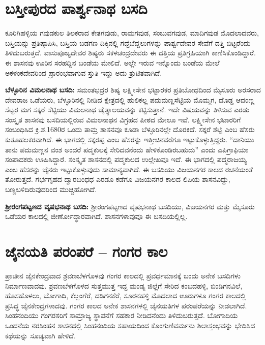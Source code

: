 \section{ಬಸ್ತೀಪುರದ ಪಾರ್ಶ್ವನಾಥ ಬಸದಿ}

ಕೂರಿಗಿಹಳ್ಳಿಯ ಗವುಡಕುಲ ತಿಲಕರಾದ ಕೇತಗವುಡು, ರಾಮಗವುಡ, ಸಂಬುವಗವುಡ, ಮಾದಿಗವುಡ ಮೊದಲಾದವರು, ಬಸ್ತಿಯನ್ನು ಪ್ರತಿಷ್ಠಾಪಿಸಿ, ಬಸ್ತಿಯ ಬಡಗಣ ದಿಕ್ಕಿನಲ್ಲಿ ಗದ್ದೆಬೆದ್ದಲುಗಳನ್ನು ಪಾರ್ಶ್ವದೇವರ ಸೇವೆಗೆ ದತ್ತಿ ಬಿಟ್ಟರೆಂದು ತಿಳಿದುಬರುತ್ತದೆ. ವಾಸುಪೂಜ್ಯದೇವರ ಶಿಷ್ಯರು ಸಕಳಚಂದ್ರದೇವರು ಈ ದತ್ತಿಯ ಪ್ರತಿಗ್ರಹಿಯಾಗಿ ಕಾಣಿಸಿಕೊಂಡಿದ್ದಾರೆ. ಈ ಶಾಸನವು ಊರಿನ ಸರಹದ್ದಿನ ಬಂಡೆಯ ಮೇಲಿದೆ. ಅಲ್ಲೇ ಇರುವ ಇನ್ನೊಂದು ಬಂಡೆಯ ಮೇಲೆ ಅಕಳಂಕದೇವರಿಂದ ಪ್ರಾರಂಭವಾಗುವ ಸ್ತುತಿ ಇದ್ದು ಅದು ತ್ರುಟಿತವಾಗಿದೆ.

\textbf{ಬೆಳ್ಳೂರಿನ ವಿಮಲನಾಥ ಬಸದಿ:} ಸಮಂತಭದ್ರರ ಶಿಷ್ಯ ಲಕ್ಷ್ಮೀಸೇನ ಭಟ್ಟಾರಕರ ಪ್ರತಿಬೋಧದಿಂದ ಮೈಸೂರು ಅರಸರಾದ ದೇವರಾಜ ಒಡೆಯರು, ಬೆಳ್ಳೂರಿನಲ್ಲಿ ನೀಡಿದ ಕ್ಷೇತ್ರದಲ್ಲಿ ಹುಲಿಕಲ್ಲ ಪದುಮಣ್ಣಸೆಟ್ಟಿಯ ಮೊಮ್ಮಗ, ದೊಡ್ಡ ಆದಂಣ್ಣ ಸೆಟ್ಟರ ಮಗ ಸಕ್ಕರೆ ಸೆಟ್ಟಿಯು ವಿಮಲನಾಥ ಚೈತ್ಯಾಲಯವನ್ನು ಕಟ್ಟಿಸುತ್ತಾನೆ. ಇದೇ ವಿಷಯವನ್ನು ತಿಳಿಸುವ ಎರಡು ಸಂಸ್ಕೃತ ಶಾಸನವು ಬಸದಿಯಲ್ಲಿರುವ ವಿಮಲನಾಥನ ವಿಗ್ರಹದ ಪೀಠದ ಮೇಲೂ ಇವೆ. ಲಕ್ಷ್ಮೀಸೇನ ಭಟಾರರಿಗೆ ಸಂಬಂಧಿಸಿದ ಕ್ರಿ.ಶ.1680ರ ಒಂದು ತಾಮ್ರ ಶಾಸನವೂ ಕೂಡಾ ಬೆಳ್ಳೂರಿನಲ್ಲೇ ದೊರಕಿದೆ. ಸಕ್ಕರೆ ಶೆಟ್ಟಿ ಎಂಬ ಹೆಸರು ಕುತೂಹಲಕರವಾಗಿದೆ. ಈ ಭಾಗದಲ್ಲಿ ಸಕ್ಕರಪ್ಪ ಎಂಬ ಹೆಸರನ್ನು ಇತ್ತೀಚಿನವರೆಗೂ ಇಟ್ಟುಕೊಳ್ಳುತ್ತಿದ್ದರು. “ದಾನಿಯು ತಾನು ಪದುಮಣ್ಣನ ವಂಶ ಅಂದರೆ ಪದ್ಮಕುಲಕ್ಕೆ ಸೇರಿದವನೆಂದು ಹೇಳಿಕೊಂಡಿರಬಹುದು” ಎಂದು ಎಪಿಗ್ರಾಫಿಯಾ ಸಂಪಾದಕರು ಊಹಿಸಿದ್ದಾರೆ. ಸಂಸ್ಕೃತ ಶಾಸನದಲ್ಲಿ ಪದ್ಮಕುಲದ ಉಲ್ಲೇಖವೂ ಇದೆ. ಈ ಭಾಗದಲ್ಲಿ ಪದ್ಮರಾಜಯ್ಯ ಎಂಬ ಹೆಸರನ್ನು ಜೈನರು ಇಟ್ಟುಕೊಳ್ಳುವುದು ಸಾಮಾನ್ಯವಾಗಿದೆ. ಈ ಬಸದಿಯು ವಿಜಯನಗರ ಕಾಲದ ರಚನೆಯಂತೆ ತೋರುತ್ತದೆ. ಗರ್ಭಗೃಹದ ದ್ವಾರಬಂಧಧ ಎರಡೂ ಕಡೆಗೂ ವಿಜಯನಗರ ಕಾಲದ ಲಿಪಿಯ ಶಾಸನವಿದ್ದು, ಬಣ್ಣಬಳಿದಿರುವುದರಿಂದ ಮುಚ್ಚಿಹೋಗಿದೆ. 

\textbf{ಶ‍್ರೀರಂಗಪಟ್ಟಣದ ವೃಷಭನಾಥ ಬಸದಿ:} ಶ‍್ರೀರಂಗಪಟ್ಟಣದ ವೃಷಭನಾಥ ಬಸದಿಯು, ವಿಜಯನಗರ ಮತ್ತು ಮೈಸೂರು ಒಡೆಯರ ಕಾಲದಲ್ಲಿ ಜೀರ್ಣೋದ್ಧಾರವಾಗಿದೆ. ಶಾಸನಗಳಾವುವೂ ಈ ಬಸದಿಯಲ್ಲಿಲ್ಲ.


\section{ಜೈನಯತಿ ಪರಂಪರೆ – ಗಂಗರ ಕಾಲ}

ಪ್ರಾಚೀನ ಜೈನಕೇಂದ್ರವಾದ ಶ್ರವಣಬೆಳಗೊಳವು ಗಂಗರ ಕಾಲದಲ್ಲಿ ಪ್ರವರ್ಧಮಾನಕ್ಕೆ ಬಂದು ಅನೇಕ ಬಸದಿಗಳು ನಿರ್ಮಾಣವಾದವು. ಶ್ರವಣಬೆಳಗೊಳದ ಸುತ್ತಮುತ್ತ ಇದ್ದ ಮಂಡ್ಯ ಜಿಲ್ಲೆಗೆ ಸೇರಿದ ಕಂಬದಹಳ್ಳಿ, ಬಿಂಡಿಗನವಿಲೆ, ಹೊಸಹೊಳಲು, ಬೋಗಾದಿ, ಕೆಲ್ಲಂಗೆರೆ, ದಡಿಗನಕೆರೆ, ಸೂರನಹಳ್ಳಿ ಮೊದಲಾದ ಊರುಗಳೂ ಗಂಗರ ಕಾಲದಲ್ಲಿ ಪ್ರಸಿದ್ಧ ಜೈನಕೇಂದ್ರಗಳಾದವು. ಗಂಗರ ಕಾಲದ ಅನೇಕ ಶಾಸನಗಳಲ್ಲಿ ಜೈನಯತಿಗಳ ಪರಂಪರೆಯನ್ನು ನೀಡಲಾಗಿದೆ. ಸಿಂಹನಂದಿಯು ಗಂಗರಸರಿಗೆ ಸಾಮ್ರಾಜ್ಯ ಸ್ಥಾಪನೆಗೆ ಸಹಕಾರ ನೀಡಿದನೆಂದು ತಿಳಿದುಬರುತ್ತದೆ. ಬೋಗಾದಿಯ ಒಂದನೆಯ ನರಸಿಂಹನ ಶಾಸನದಲ್ಲಿ ಸಿಂಹನಂದಿಯ ಸಹಾಯದಿಂದ ಕೊಂಗುಣಿವರ್ಮನು ಶಿಲಾಸ್ತಂಭವನ್ನು ಭೇದಿಸಿದ ಕಥೆಯನ್ನು ಸೂಚ್ಯವಾಗಿ ಹೇಳಿದೆ.

